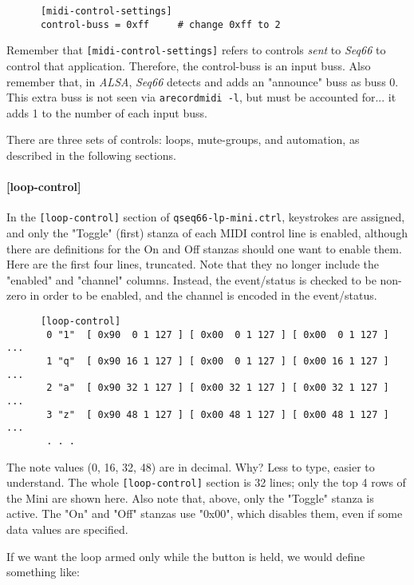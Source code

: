    \begin{verbatim}
      [midi-control-settings]
      control-buss = 0xff     # change 0xff to 2
   \end{verbatim}

   Remember that \texttt{[midi-control-settings]} refers to controls
   \textsl{sent} to \textsl{Seq66} to control that application.
   Therefore, the control-buss is an input buss.
   Also remember that, in \textsl{ALSA}, \textsl{Seq66} detects and adds an
   "announce" buss as buss 0.  This extra buss is not seen via
   \texttt{arecordmidi -l}, but must be accounted for... it adds 1 to the
   number of each input buss.

   There are three sets of controls:  loops, mute-groups, and automation, as
   described in the following sections.

\paragraph{[loop-control]}
\label{paragraph:patterns_loop_control}

   In the \texttt{[loop-control]} section of \texttt{qseq66-lp-mini.ctrl},
   keystrokes are assigned, and only the "Toggle" (first)
   stanza of each MIDI control line
   is enabled, although there are definitions for the On and Off stanzas
   should one want to enable them.  Here are the first four lines, truncated.
   Note that they no longer include the "enabled" and "channel" columns.
   Instead, the event/status is checked to be non-zero in order to be enabled,
   and the channel is encoded in the event/status.

   \begin{verbatim}
      [loop-control]
       0 "1"  [ 0x90  0 1 127 ] [ 0x00  0 1 127 ] [ 0x00  0 1 127 ] ...
       1 "q"  [ 0x90 16 1 127 ] [ 0x00  0 1 127 ] [ 0x00 16 1 127 ] ...
       2 "a"  [ 0x90 32 1 127 ] [ 0x00 32 1 127 ] [ 0x00 32 1 127 ] ...
       3 "z"  [ 0x90 48 1 127 ] [ 0x00 48 1 127 ] [ 0x00 48 1 127 ] ...
       . . .
   \end{verbatim}

   The note values (0, 16, 32, 48) are in decimal. Why?
   Less to type, easier to understand.
   The whole \texttt{[loop-control]} section is 32 lines;
   only the top 4 rows of the Mini are shown here.
   Also note that, above, only the "Toggle" stanza is active.
   The "On" and "Off" stanzas use "0x00", which disables them, even
   if some data values are specified.

   If we want the loop armed only while the button is held, we would
   define something like:

